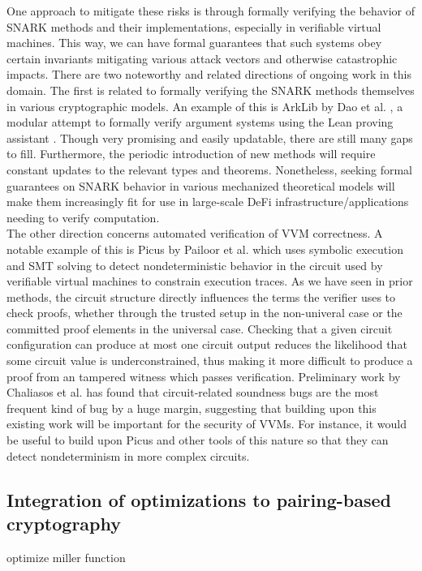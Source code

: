 \noindent One approach to mitigate these risks is through formally verifying the behavior of SNARK methods and their implementations, especially in verifiable virtual machines. This way, we can have formal guarantees that such systems obey certain invariants mitigating various attack vectors and otherwise catastrophic impacts. There are two noteworthy and related directions of ongoing work in this domain. The first is related to formally verifying the SNARK methods themselves in various cryptographic models. An example of this is ArkLib by Dao et al. \cite{arklib}, a modular attempt to formally verify argument systems using the Lean proving assistant \cite{lean4}. Though very promising and easily updatable, there are still many gaps to fill. Furthermore, the periodic introduction of new methods will require constant updates to the relevant types and theorems. Nonetheless, seeking formal guarantees on SNARK behavior in various mechanized theoretical models will make them increasingly fit for use in large-scale DeFi infrastructure/applications needing to verify computation. \\

\noindent The other direction concerns automated verification of VVM correctness. A notable example of this is Picus by Pailoor et al. \cite{picus} which uses symbolic execution and SMT solving to detect nondeterministic behavior in the circuit used by verifiable virtual machines to constrain execution traces. As we have seen in prior methods, the circuit structure directly influences the terms the verifier uses to check proofs, whether through the trusted setup in the non-univeral case or the committed proof elements in the universal case. Checking that a given circuit configuration can produce at most one circuit output reduces the likelihood that some circuit value is underconstrained, thus making it more difficult to produce a proof from an tampered witness which passes verification. Preliminary work by Chaliasos et al. \cite{sok} has found that circuit-related soundness bugs are the most frequent kind of bug by a huge margin, suggesting that building upon this existing work will be important for the security of VVMs. For instance, it would be useful to build upon Picus and other tools of this nature so that they can detect nondeterminism in more complex circuits.

\subsection{Integration of optimizations to pairing-based cryptography}
\noindent optimize miller function\\

